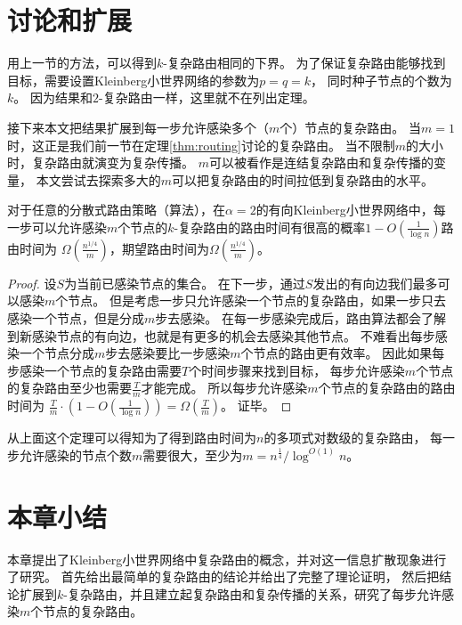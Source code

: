 \section{讨论和扩展}
用上一节的方法，可以得到$k$-复杂路由相同的下界。
为了保证复杂路由能够找到目标，需要设置Kleinberg小世界网络的参数为$p = q = k$，
同时种子节点的个数为$k$。
因为结果和$2$-复杂路由一样，这里就不在列出定理。


接下来本文把结果扩展到每一步允许感染多个（$m$个）节点的复杂路由。
当$m=1$时，这正是我们前一节在定理\ref{thm:routing}讨论的复杂路由。
当不限制$m$的大小时，复杂路由就演变为复杂传播。
$m$可以被看作是连结复杂路由和复杂传播的变量，
本文尝试去探索多大的$m$可以把复杂路由的时间拉低到复杂路由的水平。




\begin{theorem}
对于任意的分散式路由策略（算法），在$\alpha = 2$的有向Kleinberg小世界网络中，每一步可以允许感染$m$个节点的$k$-复杂路由的路由时间有很高的概率$1-O(\frac{1}{\log n})$路由时间为
$\Omega(\frac{n^{1/4}}{m})$，期望路由时间为$\Omega(\frac{n^{1/4}}{m})$。
\end{theorem}

\begin{proof}
设$S$为当前已感染节点的集合。
在下一步，通过$S$发出的有向边我们最多可以感染$m$个节点。
但是考虑一步只允许感染一个节点的复杂路由，如果一步只去感染一个节点，但是分成$m$步去感染。
在每一步感染完成后，路由算法都会了解到新感染节点的有向边，也就是有更多的机会去感染其他节点。
不难看出每步感染一个节点分成$m$步去感染要比一步感染$m$个节点的路由更有效率。
因此如果每步感染一个节点的复杂路由需要$T$个时间步骤来找到目标，
每步允许感染$m$个节点的复杂路由至少也需要$\frac{T}{m}$才能完成。
所以每步允许感染$m$个节点的复杂路由的路由时间为
$\frac{T}{m} \cdot (1-O(\frac{1}{\log n})) = \Omega(\frac{T}{m})$。
证毕。
\end{proof}

从上面这个定理可以得知为了得到路由时间为$n$的多项式对数级的复杂路由，
每一步允许感染的节点个数$m$需要很大，至少为$m = n^{\frac{1}{4}} / \log^{O(1)} n$。

\section{本章小结}

本章提出了Kleinberg小世界网络中复杂路由的概念，并对这一信息扩散现象进行了研究。
首先给出最简单的复杂路由的结论并给出了完整了理论证明，
然后把结论扩展到$k$-复杂路由，并且建立起复杂路由和复杂传播的关系，研究了每步允许感染$m$个节点的复杂路由。

